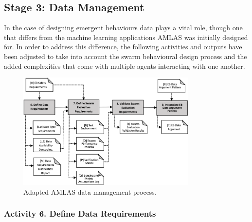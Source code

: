 \documentclass[lettersize,journal]{IEEEtran}
\begin{document}
\subsection{Stage 3: Data Management} \label{framework-stage3}

In the case of designing emergent behaviours data plays a vital role, though one that differs from the machine learning applications AMLAS was initially designed for. In order to address this difference, the following activities and outputs have been adjusted to take into account the swarm behavioural design process and the added complexities that come with multiple agents interacting with one another.

\begin{figure}
	\centering
	\includegraphics[width=0.8\textwidth]{figures/Stage3_DM_V2.png}
	\caption{Adapted AMLAS data management process.}
	\label{amlas-a-stage3}
\end{figure}

\subsubsection*{Activity 6. Define Data Requirements}
\end{document}
